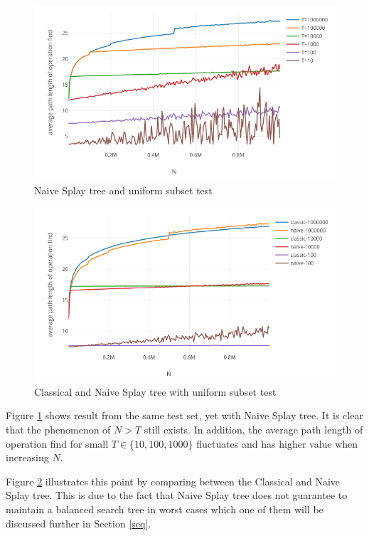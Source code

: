 \documentclass{article}
\begin{document}
\begin{figure}[h!]
\centering
\includegraphics[width=\textwidth]{NTIN066-plot2.png}
\caption{Naive Splay tree and uniform subset test}
\label{fig:plot2}
\end{figure}

\begin{figure}[h!]
\centering
\includegraphics[width=\textwidth]{NTIN066-plot3.png}
\caption{Classical and Naive Splay tree with uniform subset test}
\label{fig:plot3}
\end{figure}

Figure \ref{fig:plot2} shows result from the same test set, yet with Naive Splay tree. It is clear that the phenomenon of $N>T$ still exists. In addition, the average path length of operation find for small $T \in \{10,100,1000\}$ fluctuates and has higher value when increasing $N$.

Figure \ref{fig:plot3} illustrates this point by comparing between the Classical and Naive Splay tree. This is due to the fact that Naive Splay tree does not guarantee to maintain a balanced search tree in worst cases which one of them will be discussed further in Section \ref{seq}.
\end{document}
